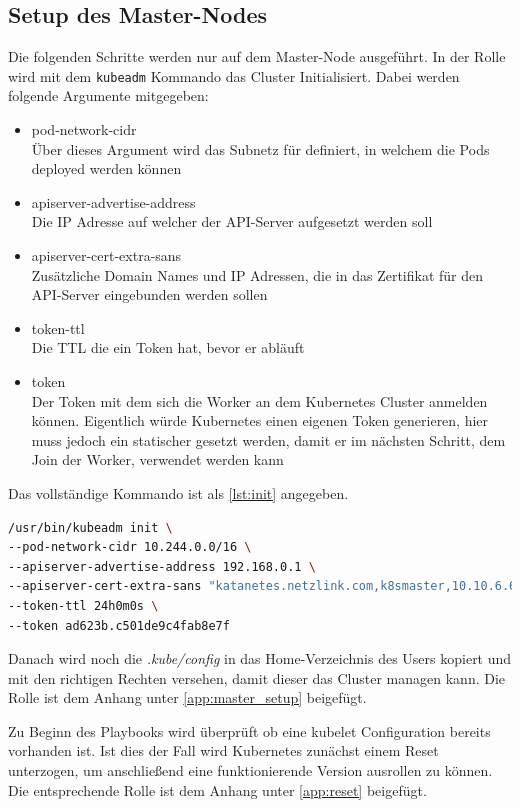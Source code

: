 \subsection{Setup des Master-Nodes}
Die folgenden Schritte werden nur auf dem Master-Node ausgeführt. 
In der Rolle wird mit dem \texttt{kubeadm} Kommando das Cluster Initialisiert.
Dabei werden folgende Argumente mitgegeben:
\begin{itemize}
    \item pod-network-cidr \\ Über dieses Argument wird das Subnetz für definiert, in welchem die Pods deployed werden können
    \item apiserver-advertise-address \\ Die \ac{IP} Adresse auf welcher der \ac{API}-Server aufgesetzt werden soll
    \item apiserver-cert-extra-sans \\ Zusätzliche Domain Names und \ac{IP} Adressen, die in das Zertifikat für den \ac{API}-Server eingebunden werden sollen
    \item token-ttl \\ Die \ac{TTL} die ein Token hat, bevor er abläuft
    \item token \\ Der Token mit dem sich die Worker an dem Kubernetes Cluster anmelden können. Eigentlich würde Kubernetes einen eigenen Token generieren, hier muss jedoch ein statischer gesetzt werden, damit er im nächsten Schritt, dem Join der Worker, verwendet werden kann
\end{itemize}
Das vollständige Kommando ist als \ref{lst:init} angegeben.
\begin{lstlisting}[language=bash, caption={kubeadm init}, label=lst:init]
/usr/bin/kubeadm init \
--pod-network-cidr 10.244.0.0/16 \
--apiserver-advertise-address 192.168.0.1 \
--apiserver-cert-extra-sans "katanetes.netzlink.com,k8smaster,10.10.6.60,192.168.0.1,api.katernetes.local" \
--token-ttl 24h0m0s \
--token ad623b.c501de9c4fab8e7f
\end{lstlisting}

Danach wird noch die \textit{.kube/config} in das Home-Verzeichnis des Users kopiert und mit den richtigen Rechten versehen, damit dieser das Cluster managen kann.
Die Rolle ist dem Anhang unter \ref{app:master_setup} beigefügt.

Zu Beginn des Playbooks wird überprüft ob eine kubelet Configuration bereits vorhanden ist. 
Ist dies der Fall wird Kubernetes zunächst einem Reset unterzogen, um anschließend eine funktionierende Version ausrollen zu können.
Die entsprechende Rolle ist dem Anhang unter \ref{app:reset} beigefügt.


